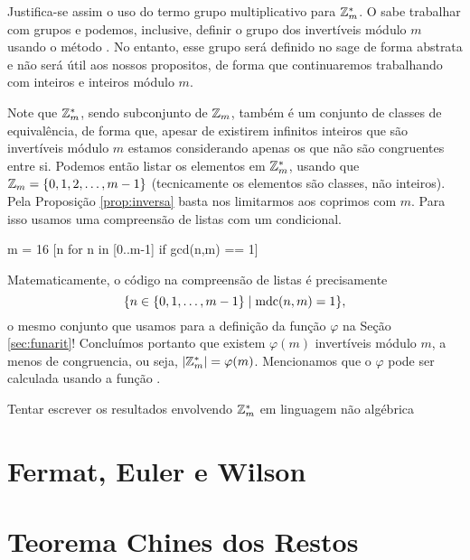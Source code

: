 Justifica-se assim o uso do termo grupo multiplicativo para
$\mathbb{Z}_m^*$. O \sage sabe trabalhar com grupos e podemos, inclusive,
definir o grupo dos invertíveis módulo $m$ usando o
método . No entanto, esse grupo será definido
no sage de forma abstrata e não será útil aos nossos propositos,
de forma que continuaremos trabalhando com inteiros e inteiros
módulo $m$.

Note que $\mathbb{Z}_m^*$, sendo subconjunto de $\mathbb{Z}_m$,
também é um conjunto de classes de equivalência, de forma
que, apesar de existirem infinitos inteiros que são
invertíveis módulo $m$ estamos considerando apenas os
que não são congruentes entre si. Podemos então
listar os elementos em $\mathbb{Z}_m^*$, usando
que $\mathbb{Z}_m = \{0,1,2,\dots,m-1\}$ (tecnicamente os 
elementos são classes, não inteiros). Pela Proposição
\ref{prop:inversa} basta nos limitarmos aos 
coprimos com $m$. Para isso usamos uma compreensão de listas
com um condicional.
\begin{sageinput}
m = 16
[n for n in [0..m-1] if gcd(n,m) == 1]
\end{sageinput}
\begin{sageoutput}
[1, 3, 5, 7, 9, 11, 13, 15]
\end{sageoutput}
Matematicamente, o código na compreensão de listas
é precisamente $$\{n \in \{0,1,\dots,m-1\} \mid \operatorname{mdc}(n,m) = 1\},$$
o mesmo conjunto que usamos para a definição da função $\varphi$
na Seção \ref{sec:funarit}! Concluímos portanto que existem
$\varphi(m)$ invertíveis módulo $m$, a menos de congruencia,
ou seja, $|\mathbb{Z}_m^\ast| = \varphi(m)$. Mencionamos que o $\varphi$
pode ser calculada usando a função .


\begin{tcolorbox}[colback=red!5,colframe=red!75!black,title=Objetivo]
 Tentar escrever os resultados envolvendo $\mathbb{Z}_m^\ast$
em linguagem não algébrica
\end{tcolorbox}
\section{Fermat, Euler e Wilson}




\section{Teorema Chines dos Restos}


